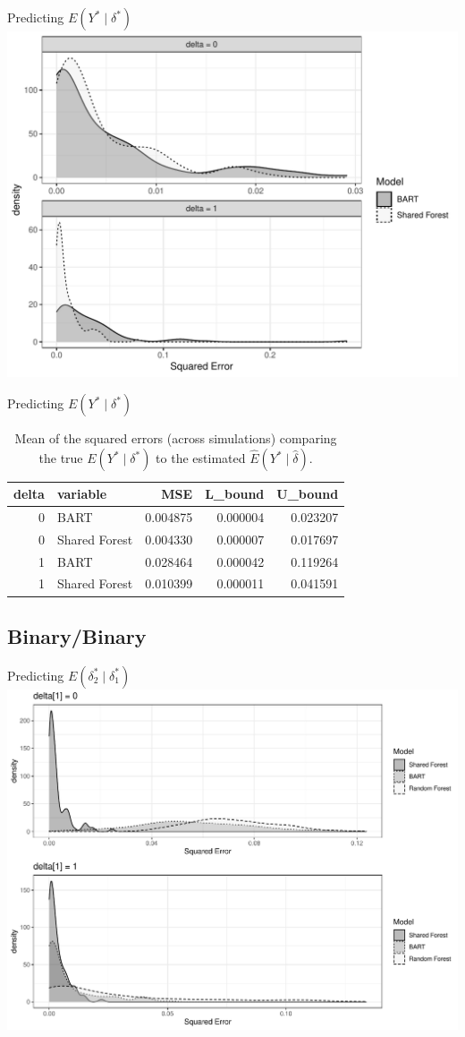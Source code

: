 \documentclass{beamer}
\begin{document}
\begin{frame}{Predicting $E(Y^* \mid \delta^*)$ }
\includegraphics[width = .9\linewidth]{continuous_sim_results.pdf}
\end{frame}

\begin{frame}{Predicting $E(Y^* \mid \delta^*)$ }

\begin{table}[ht]
\centering
\begin{tabular}{rlrrr}
  \hline
delta & variable & MSE & L\_bound & U\_bound \\ 
  \hline
0 & BART & 0.004875 & 0.000004 & 0.023207 \\ 
  0 & Shared Forest & 0.004330 & 0.000007 & 0.017697 \\ 
  1 & BART & 0.028464 & 0.000042 & 0.119264 \\ 
  1 & Shared Forest & 0.010399 & 0.000011 & 0.041591 \\ 
   \hline
\end{tabular}
\caption{\label{tab:mse} Mean of the squared errors (across simulations) comparing the true $E(Y^* \mid \delta^*)$ to the estimated $\hat{E}(Y^* \mid \hat{\delta})$.}
\end{table}

\end{frame}

\subsection{Binary/Binary} 

\begin{frame}{Predicting $E(\delta_2^* \mid \delta_1^*)$ }
\includegraphics[width = .9\linewidth]{binary_sim_results.pdf}
\end{frame}
\end{document}

